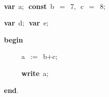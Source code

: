 
\fboxsep=0pt
\def\insert#1{$\fbox{#1}$}
\def\delete#1{$\fboxrule=.5mm\fbox{#1}$}
\rm
\ \par
{\bf var}\ a$;$\ {\bf const}\ {\sf b}\ $=$\ 7$,$\ {\sf c}\ $=$\ 8$;$\ \par
{\bf var}\ d$;$\ {\bf var}\ e$;$\ \par
{\bf begin}\ \par
\ \ \ \ \ a\ $:=$\ {\sf b}$+${\sf c}$;$\ \par
\ \ \ \ \ {\bf write}\ a$;$\ \par
{\bf end}$.$

